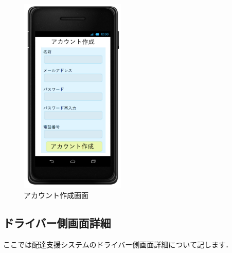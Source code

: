 \documentclass[a4j,titlepage]{jarticle}
\begin{document}
\begin{figure}[htbp]
 \begin{center}
  \includegraphics[width=50mm]{account_create.pdf}
	\caption{アカウント作成画面}
	\label{fig:account_create}
 \end{center}

\end{figure}

\subsection{ドライバー側画面詳細}
ここでは配達支援システムのドライバー側画面詳細について記します．
\end{document}
